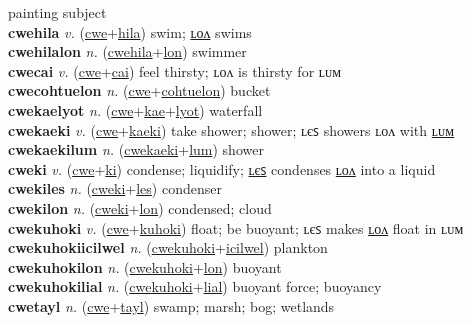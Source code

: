 painting subject \label{cwemwonilum} \\
\textbf{cwehila} \textit{v.} (\hyperref[cwe]{cwe}+\hyperref[hila]{hila})
swim; \hyperref[cwehilalon]{ʟᴏᴧ} swims \label{cwehila} \\
\textbf{cwehilalon} \textit{n.} (\hyperref[cwehila]{cwehila}+\hyperref[lon]{lon})
swimmer \label{cwehilalon} \\
\textbf{cwecai} \textit{v.} (\hyperref[cwe]{cwe}+\hyperref[cai]{cai})
feel thirsty; ʟᴏᴧ is thirsty for ʟᴜᴍ \label{cwecai} \\
\textbf{cwecohtuelon} \textit{n.} (\hyperref[cwe]{cwe}+\hyperref[cohtuelon]{cohtuelon})
bucket \label{cwecohtuelon} \\
\textbf{cwekaelyot} \textit{n.} (\hyperref[cwe]{cwe}+\hyperref[kae]{kae}+\hyperref[lyot]{lyot})
waterfall \label{cwekaelyot} \\
\textbf{cwekaeki} \textit{v.} (\hyperref[cwe]{cwe}+\hyperref[kaeki]{kaeki})
take shower; shower; ʟєꜱ showers ʟᴏᴧ with \hyperref[cwekaekilum]{ʟᴜᴍ} \label{cwekaeki} \\
\textbf{cwekaekilum} \textit{n.} (\hyperref[cwekaeki]{cwekaeki}+\hyperref[lum]{lum})
shower \label{cwekaekilum} \\
\textbf{cweki} \textit{v.} (\hyperref[cwe]{cwe}+\hyperref[ki]{ki})
condense; liquidify; \hyperref[cwekiles]{ʟєꜱ} condenses \hyperref[cwekilon]{ʟᴏᴧ} into a liquid \label{cweki} \\
\textbf{cwekiles} \textit{n.} (\hyperref[cweki]{cweki}+\hyperref[les]{les})
condenser \label{cwekiles} \\
\textbf{cwekilon} \textit{n.} (\hyperref[cweki]{cweki}+\hyperref[lon]{lon})
condensed; cloud \label{cwekilon} \\
\textbf{cwekuhoki} \textit{v.} (\hyperref[cwe]{cwe}+\hyperref[kuhoki]{kuhoki})
float; be buoyant; ʟєꜱ makes \hyperref[cwekuhokilon]{ʟᴏᴧ} float in ʟᴜᴍ \label{cwekuhoki} \\
\textbf{cwekuhokiicilwel} \textit{n.} (\hyperref[cwekuhoki]{cwekuhoki}+\hyperref[icilwel]{icilwel})
plankton \label{cwekuhokiicilwel} \\
\textbf{cwekuhokilon} \textit{n.} (\hyperref[cwekuhoki]{cwekuhoki}+\hyperref[lon]{lon})
buoyant \label{cwekuhokilon} \\
\textbf{cwekuhokilial} \textit{n.} (\hyperref[cwekuhoki]{cwekuhoki}+\hyperref[lial]{lial})
buoyant force; buoyancy \label{cwekuhokilial} \\
\textbf{cwetayl} \textit{n.} (\hyperref[cwe]{cwe}+\hyperref[tayl]{tayl})
swamp; marsh; bog; wetlands \label{cwetayl} \\
